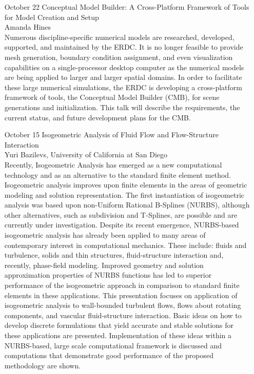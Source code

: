 \documentclass[12]{article}
\begin{document}
\begin{enumerate}
\item[October 22] Conceptual Model Builder: A Cross-Platform Framework of Tools for Model Creation and Setup\\
  Amanda Hines\\
  Numerous discipline-specific numerical models are researched, developed, supported, and maintained by the ERDC.  It is no longer feasible to provide mesh generation, boundary condition assignment, and even visualization capabilities on a single-processor desktop computer as the numerical models are being applied to larger and larger spatial domains.  In order to facilitate these large numerical simulations, the ERDC is developing a cross-platform framework of tools, the Conceptual Model Builder (CMB), for scene generations and initialization.  This talk will describe the requirements, the current status, and future development plans for the CMB.


\item[October 15] Isogeometric Analysis of Fluid Flow and Flow-Structure Interaction\\
  Yuri Bazilevs, University of California at San Diego\\
  Recently, Isogeometric Analysis has emerged as a new computational
  technology and as an alternative to the standard finite element
  method.  Isogeometric analysis improves upon finite elements in the
  areas of geometric modeling and solution representation. The first
  instantiation of isogeometric analysis was based upon non-Uniform
  Rational B-Splines (NURBS), although other alternatives, such as
  subdivision and T-Splines, are possible and are currently under
  investigation. Despite its recent emergence, NURBS-based
  isogeometric analysis has already been applied to many areas of
  contemporary interest in computational mechanics. These include:
  fluids and turbulence, solids and thin structures, fluid-structure
  interaction and, recently, phase-field modeling. Improved geometry
  and solution approximation properties of NURBS functions has led to
  superior performance of the isogeometric approach in comparison to
  standard finite elements in these applications. This presentation
  focuses on application of isogeometric analysis to wall-bounded
  turbulent flows, flows about rotating components, and vascular
  fluid-structure interaction. Basic ideas on how to develop discrete
  formulations that yield accurate and stable solutions for these
  applications are presented. Implementation of these ideas within a
  NURBS-based, large scale computational framework is discussed and
  computations that demonstrate good performance of the proposed
  methodology are shown.


\end{enumerate}
\end{document}
